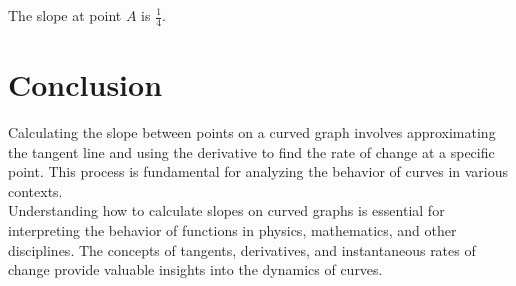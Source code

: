 \documentclass{article}
\begin{document}
The slope at point $A$ is $\frac{1}{4}$.

\section{Conclusion}

Calculating the slope between points on a curved graph involves approximating the tangent line and using the derivative to find the rate of change at a specific point. This process is fundamental for analyzing the behavior of curves in various contexts. \\

Understanding how to calculate slopes on curved graphs is essential for interpreting the behavior of functions in physics, mathematics, and other disciplines. The concepts of tangents, derivatives, and instantaneous rates of change provide valuable insights into the dynamics of curves.
\end{document}
